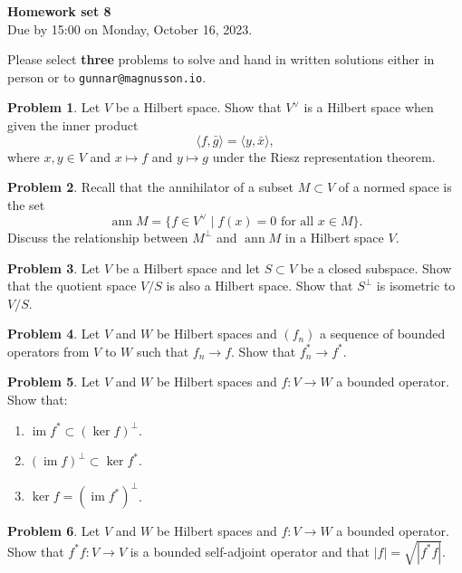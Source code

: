 \documentclass[11pt]{article}
\theoremstyle{definition}
\newtheorem{prob}{Problem}
\def\<{\langle}
\def\>{\rangle}
\DeclareMathOperator{\im}{im}
\DeclareMathOperator{\ann}{ann}
\def\head{
	\begin{center}
		\textbf{\LARGE Homework set 8}
		\\[3pt]
		Due by 15:00 on Monday, October 16, 2023.
	\end{center}
	\medskip
}
\begin{document}
\head

Please select \textbf{three} problems to solve and hand in written solutions
either in person or to \verb+gunnar@magnusson.io+.

\begin{prob}
	Let $V$ be a Hilbert space.
	Show that $V^\vee$ is a Hilbert space when given the inner product
	\[
		\< f, \bar g \> = \< y, \bar x \>,
	\]
	where $x, y \in V$ and $x \mapsto f$ and $y \mapsto g$ under the Riesz representation theorem.
\end{prob}

\begin{prob}
	Recall that the annihilator of a subset $M \subset V$ of a normed space is the set
	\[
		\ann M = \{ f \in V^\vee \mid \text{$f(x) = 0$ for all $x \in M$}\}.
	\]
	Discuss the relationship between $M^\perp$ and $\ann M$ in a Hilbert space $V$.
\end{prob}

\begin{prob}
	Let $V$ be a Hilbert space and let $S \subset V$ be a closed subspace.
	Show that the quotient space $V/S$ is also a Hilbert space.
	Show that $S^\perp$ is isometric to $V / S$.
\end{prob}

\begin{prob}
	Let $V$ and $W$ be Hilbert spaces and $(f_n)$ a sequence of bounded operators from $V$ to $W$ such that $f_n \to f$.
	Show that $f_n^* \to f^*$.
\end{prob}

\begin{prob}
	Let $V$ and $W$ be Hilbert spaces and $f : V \to W$ a bounded operator.
	Show that:
	\begin{enumerate}
		\item $\im f^* \subset (\ker f)^\perp$.
		\item $(\im f)^\perp \subset \ker f^*$.
		\item $\ker f = (\im f^*)^\perp$.
	\end{enumerate}
\end{prob}

\begin{prob}
	Let $V$ and $W$ be Hilbert spaces and $f : V \to W$ a bounded operator.
	Show that $f^* f : V \to V$ is a bounded self-adjoint operator and that $|f| = \sqrt{|f^* f|}$.
\end{prob}
\end{document}
